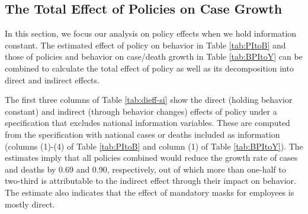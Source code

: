\documentclass[3p, longtitle]{elsarticle}
\theoremstyle{definition}
\renewcommand{\to}{{\rightarrow}}
\def\bcolor{\color{ForestGreen}}
\def\pcolor{\color{blue}}
\begin{document}
%    


\subsection{The Total Effect of Policies on Case Growth\label{total-policy-effect}}


In this section, we focus our analysis on policy effects when we hold
information constant. The estimated effect of policy on
behavior in Table \ref{tab:PItoB} and those of policies and
behavior on case/death growth in Table  \ref{tab:BPItoY}  can be
combined to calculate the total effect of policy as well as its
decomposition into  direct and indirect effects.

The first three columns of Table \ref{tab:dieff-si} show the direct
(holding behavior constant) and indirect (through behavior changes)
effects of policy under a specification that excludes national information variables. These are computed from the specification with
national cases or deaths included as information (columns (1)-(4) of
Table \ref{tab:PItoB} and column (1) of Table \ref{tab:BPItoY}). The estimates imply
that all policies combined would reduce the growth rate of cases  and deaths by
0.69 and 0.90, respectively,   out of which more than one-half to
two-third is attributable to the indirect effect through their impact on behavior.  The estimate also indicates that the
effect of mandatory masks for employees is mostly direct.
\end{document}
